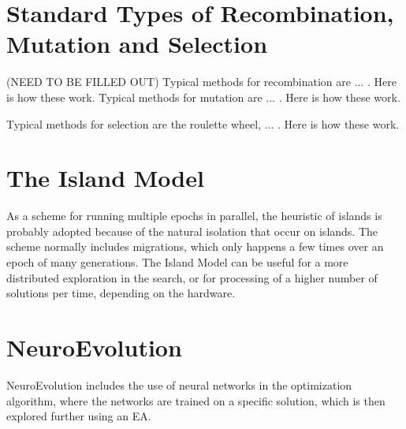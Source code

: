 \section{Standard Types of Recombination, Mutation and Selection}
(NEED TO BE FILLED OUT)
Typical methods for recombination are ... .
Here is how these work.
Typical methods for mutation are ... .
Here is how these work.

Typical methods for selection are the roulette wheel, ... .
Here is how these work.

\section{The Island Model}
As a scheme for running multiple epochs in parallel, the heuristic of islands is probably adopted because of the natural isolation that occur on islands.
The scheme normally includes migrations, which only happens a few times over an epoch of many generations.
The Island Model can be useful for a more distributed exploration in the search, or for processing of a higher number of solutions per time, depending on the hardware.

\section{NeuroEvolution}
NeuroEvolution includes the use of neural networks in the optimization algorithm, where the networks are trained on a specific solution, which is then explored further using an EA.




